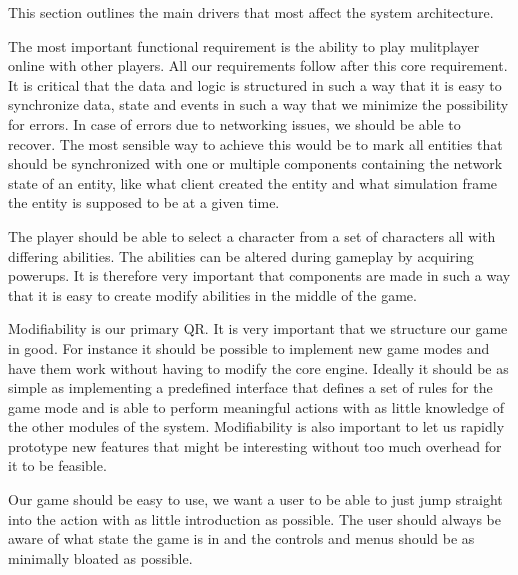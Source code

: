 	This section outlines the main drivers that most affect the system architecture.

	The most important functional requirement is the ability to play mulitplayer online with other	players. All our requirements follow after this core requirement. It is critical that the data and logic is structured in such a way that it is easy to synchronize data, state and events in such a way that we minimize the possibility for errors. In case of errors due to networking issues, we should be able to recover. The most sensible way to achieve this would be to mark all entities 	that should be synchronized with one or multiple components containing the network state of an entity, like what client created the entity and what simulation frame the entity is supposed to be at a given time.

	The player should be able to select a character from a set of characters all with differing abilities. The abilities can be altered during gameplay by acquiring powerups. It is therefore very important that components are made in such a way that it is easy to create modify abilities in the middle of the game.

	Modifiability is our primary QR. It is very important that we structure our game in good. For instance it should be possible to implement new game modes and have them work without having to modify the core engine. Ideally it should be as simple as implementing a predefined interface that defines a set of rules for the game mode and is able to perform meaningful actions with as little knowledge of the other modules of the system. Modifiability is also important to let us rapidly prototype new features that might be interesting without too much overhead for it to be feasible.

	Our game should be easy to use, we want a user to be able to just jump straight into the action with as little introduction as possible. The user should always be aware of what state the game is in and the controls and menus should be as minimally bloated as possible.

